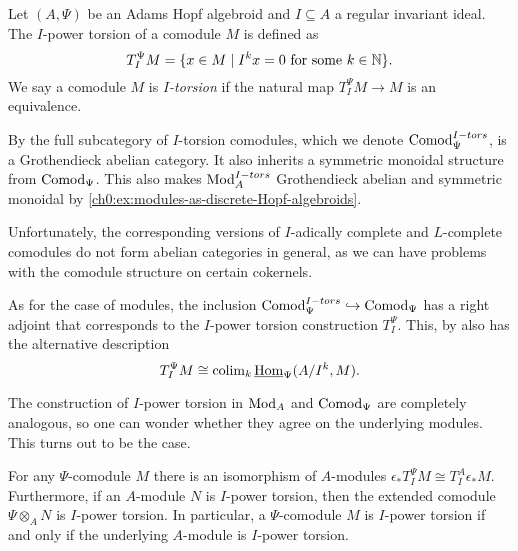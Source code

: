 \begin{definition}
    \label{ch0:def:I-power-torsion-comodule}
    Let $(A,\Psi)$ be an Adams Hopf algebroid and $I\subseteq A$ a regular invariant ideal. The $I$-power torsion of a comodule $M$ is defined as 
    \[T_I^\Psi M = \{x\in M \mid I^kx = 0 \text{ for some } k\in \mathbb{N}\}.\]
    We say a comodule $M$ is \emph{$I$-torsion} if the natural map $T_I^\Psi M\longrightarrow M$ is an equivalence. 
\end{definition}

\begin{remark}
    \label{ch0:rm:torsion-comodules-grothendieck-monoidal}
    By \cite[5.10]{barthel-heard-valenzuela_2018} the full subcategory of $I$-torsion comodules, which we denote $\mathrm{Comod}_\Psi^{I-tors}$, is a Grothendieck abelian category. It also inherits a symmetric monoidal structure from $\mathrm{Comod}_\Psi$. This also makes $\mathrm{Mod}_A^{I-tors}$ Grothendieck abelian and symmetric monoidal by \cref{ch0:ex:modules-as-discrete-Hopf-algebroids}. 
\end{remark}

\begin{remark}
    \label{ch0:rm:complete-comodules-not-abelian}
    Unfortunately, the corresponding versions of $I$-adically complete and $L$-complete comodules do not form abelian categories in general, as we can have problems with the comodule structure on certain cokernels.
\end{remark}

As for the case of modules, the inclusion $\mathrm{Comod}_\Psi^{I-tors}\hookrightarrow \mathrm{Comod}_\Psi$ has a right adjoint that corresponds to the $I$-power torsion construction $T_I^\Psi$. This, by \cite[5.5]{barthel-heard-valenzuela_2018} also has the alternative description
\[T_I^\Psi M \cong \operatorname{colim}_k \operatorname{\underline{Hom}}_\Psi (A/I^k, M).\]

The construction of $I$-power torsion in $\mathrm{Mod}_A$ and $\mathrm{Comod}_\Psi$ are completely analogous, so one can wonder whether they agree on the underlying modules. This turns out to be the case. 

\begin{lemma}
    \label{ch0:lm:torsion-comodule-iff-torsion-module}
    For any $\Psi$-comodule $M$ there is an isomorphism of $A$-modules $\epsilon_* T^\Psi_I M \cong T^A_I \epsilon_* M.$
    Furthermore, if an $A$-module $N$ is $I$-power torsion, then the extended comodule $\Psi\otimes_A N$ is $I$-power torsion. In particular, a $\Psi$-comodule $M$ is $I$-power torsion if and only if the underlying $A$-module is $I$-power torsion. 
\end{lemma}

